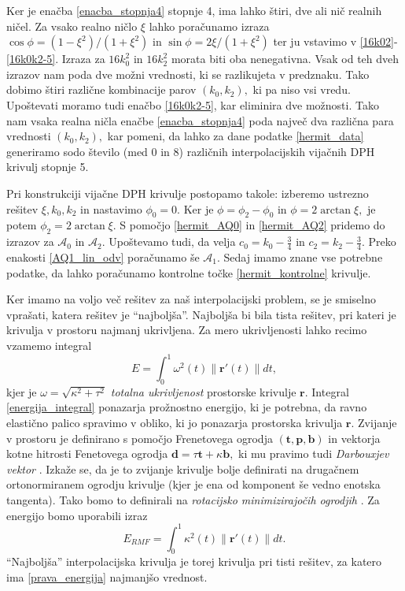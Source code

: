 \documentclass[12pt,a4paper,twoside]{article}
\theoremstyle{definition} %
\theoremstyle{plain} %
\theoremstyle{primerstyle}
\numberwithin{equation}{section}  %
\newcommand{\tV}{\mathbf{t}}
\newcommand{\bV}{\mathbf{b}}
\newcommand{\dV}{\mathbf{d}}
\newcommand{\pV}{\mathbf{p}}
\newcommand{\rV}{\mathbf{r}}
\newcommand{\AQ}{\mathcal{A}}
\begin{document}
Ker je enačba \eqref{enacba_stopnja4} stopnje 4, ima lahko štiri, dve ali nič realnih ničel. Za vsako realno ničlo $\xi$ lahko poračunamo izraza $\cos\phi=(1-\xi^2)/(1+\xi^2)$ in $\sin\phi=2\xi/(1+\xi^2)$ ter ju vstavimo v \eqref{16k02}-\eqref{16k0k2-5}. Izraza za $16k_0^2$ in $16k_2^2$ morata biti oba nenegativna. Vsak od teh dveh izrazov nam poda dve možni vrednosti, ki se razlikujeta v predznaku. Tako dobimo štiri različne kombinacije parov $(k_0,k_2),$ ki pa niso vsi vredu. Upoštevati moramo tudi enačbo \eqref{16k0k2-5}, kar eliminira dve možnosti. Tako nam vsaka realna ničla enačbe \eqref{enacba_stopnja4} poda največ dva različna para vrednosti $(k_0,k_2),$ kar pomeni, da lahko za dane podatke \eqref{hermit_data} generiramo sodo število (med 0 in 8) različnih interpolacijskih vijačnih DPH krivulj stopnje 5. 

Pri konstrukciji vijačne DPH krivulje postopamo takole: izberemo ustrezno rešitev $\xi,k_0,k_2$ in nastavimo $\phi_0=0.$ Ker je $\phi=\phi_2-\phi_0$ in $\phi=2\arctan\xi,$ je potem $\phi_2=2\arctan\xi.$ S pomočjo \eqref{hermit_AQ0} in \eqref{hermit_AQ2} pridemo do izrazov za $\AQ_0$ in $\AQ_2.$ Upoštevamo tudi, da velja $c_0=k_0-\frac{3}{4}$ in $c_2=k_2-\frac{3}{4}.$ Preko enakosti \eqref{AQ1_lin_odv} poračunamo še $\AQ_1.$ Sedaj imamo znane vse potrebne podatke, da lahko poračunamo kontrolne točke \eqref{hermit_kontrolne} krivulje.

Ker imamo na voljo več rešitev za naš interpolacijski problem, se je smiselno vprašati, katera rešitev je ``najboljša''. Najboljša bi bila tista rešitev, pri kateri je krivulja v prostoru najmanj ukrivljena. Za mero ukrivljenosti lahko recimo vzamemo integral
\begin{equation}
	\label{energija_integral}
	E=\int_0^1\omega^2(t)\lVert\rV'(t)\rVert dt,
\end{equation}
kjer je $\omega=\sqrt{\kappa^2+\tau^2}$ \emph{totalna ukrivljenost} prostorske krivulje $\rV.$ Integral \eqref{energija_integral} ponazarja prožnostno energijo, ki je potrebna, da ravno elastično palico spravimo v obliko, ki jo ponazarja prostorska krivulja $\rV.$ Zvijanje v prostoru je definirano s pomočjo Frenetovega ogrodja $(\tV,\pV,\bV)$ in vektorja kotne hitrosti Fenetovega ogrodja $\dV=\tau\tV+\kappa\bV,$ ki mu pravimo tudi \emph{Darbouxjev vektor} \cite{kreyszig2019differential}. Izkaže se, da je to zvijanje krivulje bolje definirati na drugačnem ortonormiranem ogrodju krivulje (kjer je ena od komponent še vedno enotska tangenta). Tako bomo to definirali na \emph{rotacijsko minimizirajočih ogrodjih} \cite{farouki2002exact}. Za energijo bomo uporabili izraz
\begin{equation}
	\label{prava_energija}
	E_{RMF}=\int_0^1\kappa^2(t)\lVert\rV'(t)\rVert dt.
\end{equation}
``Najboljša'' interpolacijska krivulja je torej krivulja pri tisti rešitev, za katero ima \eqref{prava_energija} najmanjšo vrednost.
\end{document}
